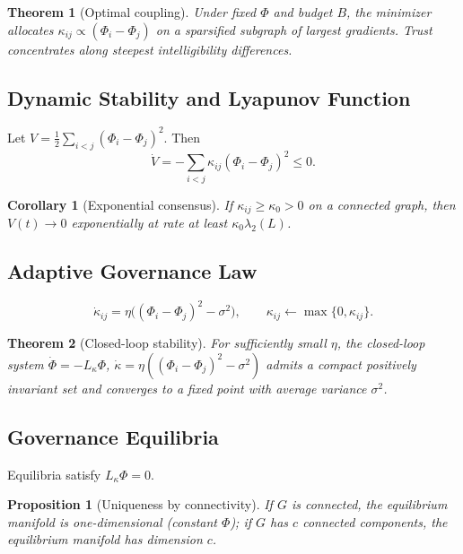 \documentclass[12pt]{article}
\newtheorem{proposition}{Proposition}
\newtheorem{theorem}{Theorem}
\newtheorem{corollary}{Corollary}
\begin{document}
\begin{theorem}[Optimal coupling]
Under fixed \(\Phi\) and budget \(B\), the minimizer allocates \(\kappa_{ij}\propto (\Phi_i-\Phi_j)\) on a sparsified subgraph of largest gradients. Trust concentrates along steepest intelligibility differences.
\end{theorem}

\subsection{Dynamic Stability and Lyapunov Function}
Let \(V=\frac{1}{2}\sum_{i<j}(\Phi_i-\Phi_j)^2\). Then
\begin{equation}
\dot V=-\sum_{i<j}\kappa_{ij}(\Phi_i-\Phi_j)^2\le 0.
\end{equation}

\begin{corollary}[Exponential consensus]
If \(\kappa_{ij}\ge\kappa_0>0\) on a connected graph, then \(V(t)\to 0\) exponentially at rate at least \(\kappa_0\lambda_2(L)\).
\end{corollary}

\subsection{Adaptive Governance Law}
\begin{equation}
\dot\kappa_{ij}=\eta\big((\Phi_i-\Phi_j)^2-\sigma^2\big),\qquad \kappa_{ij}\gets \max\{0,\kappa_{ij}\}.
\end{equation}

\begin{theorem}[Closed-loop stability]
For sufficiently small \(\eta\), the closed-loop system \(\dot\Phi=-L_\kappa\Phi\), \(\dot\kappa=\eta((\Phi_i-\Phi_j)^2-\sigma^2)\) admits a compact positively invariant set and converges to a fixed point with average variance \(\sigma^2\).
\end{theorem}

\subsection{Governance Equilibria}
Equilibria satisfy \(L_\kappa \Phi=0\).

\begin{proposition}[Uniqueness by connectivity]
If \(G\) is connected, the equilibrium manifold is one-dimensional (constant \(\Phi\)); if \(G\) has \(c\) connected components, the equilibrium manifold has dimension \(c\).
\end{proposition}
\end{document}
